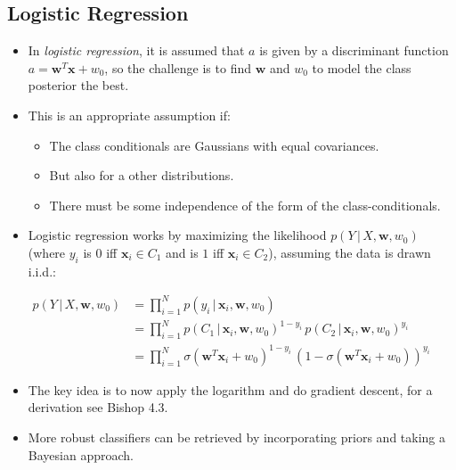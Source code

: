 \documentclass[a4paper, 11pt, accentcolor = tud3b]{tudreport}
\newcommand{\given}{\ensuremath{\,\vert\,}}
\renewcommand{\vec}[1]{\mathbf{#1}}
\begin{document}
			\subsection{Logistic Regression} %
				\begin{itemize}
					\item In \emph{logistic regression}, it is assumed that \( a \) is given by a discriminant function \( a = \vec{w}^T \vec{x} + w_0 \), so the challenge is to find \( \vec{w} \) and \( w_0 \) to model the class posterior the best.
					\item This is an appropriate assumption if:
						\begin{itemize}
							\item The class conditionals are Gaussians with equal covariances.
							\item But also for a other distributions.
							\item There must be some independence of the form of the class-conditionals.
						\end{itemize}
					\item Logistic regression works by maximizing the likelihood \( p(Y \given X, \vec{w}, w_0) \) (where \( y_i \) is \(0\) iff \( \vec{x}_i \in C_1 \) and is \( 1 \) iff \( \vec{x}_i \in C_2 \)), assuming the data is drawn i.i.d.:
				\end{itemize}
				\begin{align} %
					p(Y \given X, \vec{w}, w_0) &= \prod_{i = 1}^{N} p(y_i \given \vec{x}_i, \vec{w}, w_0) \\
						&= \prod_{i = 1}^{N} p(C_1 \given \vec{x}_i, \vec{w}, w_0)^{1 - y_i} \, p(C_2 \given \vec{x}_i, \vec{w}, w_0)^{y_i} \\
						&= \prod_{i = 1}^{N} \sigma(\vec{w}^T \vec{x}_i + w_0)^{1 - y_i} \, (1 - \sigma(\vec{w}^T \vec{x}_i + w_0))^{y_i}
				\end{align}
				\begin{itemize}
					\item The key idea is to now apply the logarithm and do gradient descent, for a derivation see Bishop 4.3.
					\item More robust classifiers can be retrieved by incorporating priors and taking a Bayesian approach.
				\end{itemize}
		
\end{document}
